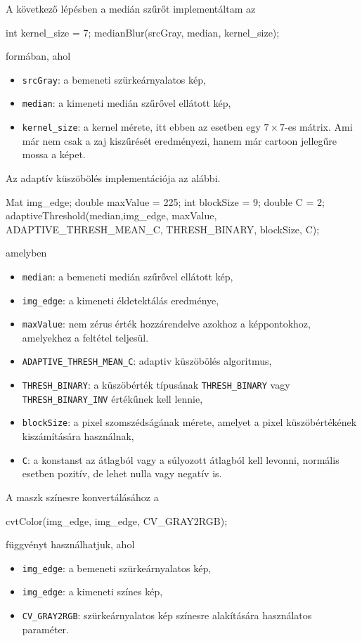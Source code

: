 A következő lépésben a medián szűrőt implementáltam az
\begin{cpp}
int kernel_size = 7;
medianBlur(srcGray, median, kernel_size);
\end{cpp}
formában, ahol
\begin{itemize}
    \item \texttt{srcGray}: a bemeneti szürkeárnyalatos kép,
    \item \texttt{median}: a kimeneti medián szűrővel ellátott kép,
    \item \texttt{kernel\_size}: a kernel mérete, itt ebben az esetben egy $7 \times 7$-es mátrix. Ami már nem csak a zaj kiszűrését eredményezi, hanem már cartoon jellegűre mossa a képet.
\end{itemize}
Az adaptív küszöbölés implementációja az alábbi.
\begin{cpp}
Mat img_edge;
double maxValue = 225;
int blockSize = 9;
double C = 2; 
adaptiveThreshold(median,img_edge, maxValue, ADAPTIVE_THRESH_MEAN_C,
                  THRESH_BINARY, blockSize, C); 
\end{cpp}
amelyben
\begin{itemize}
    \item \texttt{median}: a bemeneti medián szűrővel ellátott kép,
    \item \texttt{img\_edge}: a kimeneti éldetektálás eredménye,
    \item \texttt{maxValue}: nem zérus érték hozzárendelve azokhoz a képpontokhoz, amelyekhez a feltétel teljesül.
    \item \texttt{ADAPTIVE\_THRESH\_MEAN\_C}: adaptiv küszöbölés algoritmus,
    \item \texttt{THRESH\_BINARY}: a küszöbérték típusának \texttt{THRESH\_BINARY} vagy \texttt{THRESH\_BINARY\_INV} értékűnek kell lennie,
    \item \texttt{blockSize}: a pixel szomszédságának mérete, amelyet a pixel küszöbértékének kiszámítására használnak,
    \item \texttt{C}: a konstanst az átlagból vagy a súlyozott átlagból kell levonni, normális esetben pozitív, de lehet nulla vagy negatív is.
\end{itemize}
A maszk színesre konvertálásához a
\begin{cpp}
cvtColor(img_edge, img_edge, CV_GRAY2RGB);
\end{cpp}
függvényt használhatjuk, ahol
\begin{itemize}
    \item \texttt{img\_edge}: a bemeneti szürkeárnyalatos kép,
    \item \texttt{img\_edge}: a kimeneti színes kép,
    \item \texttt{CV\_GRAY2RGB}: szürkeárnyalatos kép színesre alakítására használatos paraméter.
\end{itemize}
